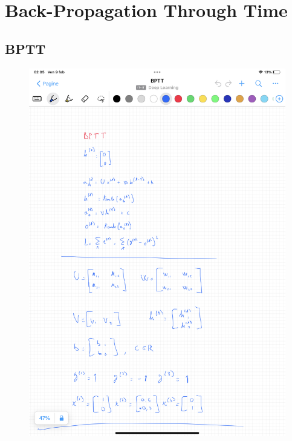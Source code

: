 \chapter{Back-Propagation Through Time}

\section{BPTT}
\begin{figure}
    \centering
    \includegraphics[scale=0.2]{images/bptt_1.PNG}
    \label{fig:enter-label}
\end{figure}
